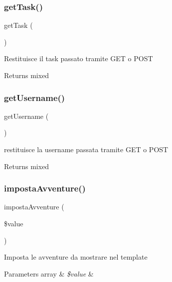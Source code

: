 \subsubsection{\texorpdfstring{get\+Task()}{getTask()}}
{\footnotesize\ttfamily get\+Task (\begin{DoxyParamCaption}{ }\end{DoxyParamCaption})}

Restituisce il task passato tramite G\+ET o P\+O\+ST

\begin{DoxyReturn}{Returns}
mixed 
\end{DoxyReturn}
\mbox{\label{class_v_utente_a81b37a3c9d639574e394f80c1138c75e}} 
\subsubsection{\texorpdfstring{get\+Username()}{getUsername()}}
{\footnotesize\ttfamily get\+Username (\begin{DoxyParamCaption}{ }\end{DoxyParamCaption})}

restituisce la username passata tramite G\+ET o P\+O\+ST

\begin{DoxyReturn}{Returns}
mixed 
\end{DoxyReturn}
\mbox{\label{class_v_utente_afcbe39b7f4848575a8fbe4e18c7261b5}} 
\subsubsection{\texorpdfstring{imposta\+Avventure()}{impostaAvventure()}}
{\footnotesize\ttfamily imposta\+Avventure (\begin{DoxyParamCaption}\item[{}]{\$value }\end{DoxyParamCaption})}

Imposta le avventure da mostrare nel template


\begin{DoxyParams}[1]{Parameters}
array & {\em \$value} & \\
\hline
\end{DoxyParams}
\mbox{\label{class_v_utente_ab3c0dc76f35667b7a13404d03b7fdb36}} 
